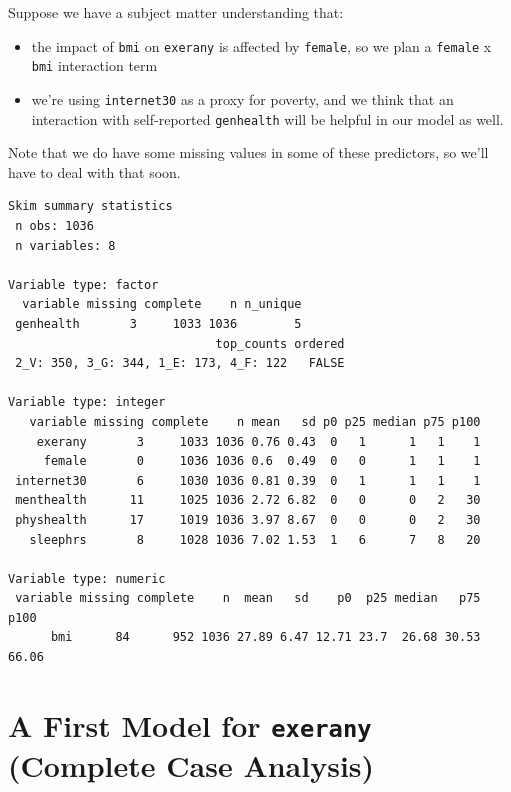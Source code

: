 \documentclass[]{book}
\newenvironment{Shaded}{\begin{snugshade}}{\end{snugshade}}
\newcommand{\KeywordTok}[1]{\textcolor[rgb]{0.13,0.29,0.53}{\textbf{#1}}}
\newcommand{\StringTok}[1]{\textcolor[rgb]{0.31,0.60,0.02}{#1}}
\newcommand{\OperatorTok}[1]{\textcolor[rgb]{0.81,0.36,0.00}{\textbf{#1}}}
\newcommand{\NormalTok}[1]{#1}
\providecommand{\tightlist}{%
  \setlength{\itemsep}{0pt}\setlength{\parskip}{0pt}}
\theoremstyle{definition}
\theoremstyle{definition}
\theoremstyle{definition}
\theoremstyle{remark}
\begin{document}
Suppose we have a subject matter understanding that:

\begin{itemize}
\tightlist
\item
  the impact of \texttt{bmi} on \texttt{exerany} is affected by
  \texttt{female}, so we plan a \texttt{female} x \texttt{bmi}
  interaction term
\item
  we're using \texttt{internet30} as a proxy for poverty, and we think
  that an interaction with self-reported \texttt{genhealth} will be
  helpful in our model as well.
\end{itemize}

Note that we do have some missing values in some of these predictors, so
we'll have to deal with that soon.

\begin{Shaded}
\end{Shaded}

\begin{verbatim}
Skim summary statistics
 n obs: 1036 
 n variables: 8 

Variable type: factor 
  variable missing complete    n n_unique
 genhealth       3     1033 1036        5
                             top_counts ordered
 2_V: 350, 3_G: 344, 1_E: 173, 4_F: 122   FALSE

Variable type: integer 
   variable missing complete    n mean   sd p0 p25 median p75 p100
    exerany       3     1033 1036 0.76 0.43  0   1      1   1    1
     female       0     1036 1036 0.6  0.49  0   0      1   1    1
 internet30       6     1030 1036 0.81 0.39  0   1      1   1    1
 menthealth      11     1025 1036 2.72 6.82  0   0      0   2   30
 physhealth      17     1019 1036 3.97 8.67  0   0      0   2   30
   sleephrs       8     1028 1036 7.02 1.53  1   6      7   8   20

Variable type: numeric 
 variable missing complete    n  mean   sd    p0  p25 median   p75  p100
      bmi      84      952 1036 27.89 6.47 12.71 23.7  26.68 30.53 66.06
\end{verbatim}

\section{\texorpdfstring{A First Model for \texttt{exerany} (Complete
Case
Analysis)}{A First Model for exerany (Complete Case Analysis)}}\label{a-first-model-for-exerany-complete-case-analysis}
\end{document}
